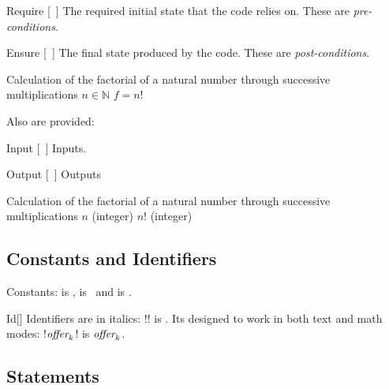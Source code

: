 \documentclass[a4paper, 11pt]{article}
\begin{document}
\begin{macro}{Require}
    [~]
    The required initial state that the code relies on. These are \textit{pre-conditions}.
\end{macro}

\begin{macro}{Ensure}
    [~]
    The final state produced by the code. These are \textit{post-conditions}.
\end{macro}

\begin{tcblisting}{}
    \begin{algorithmic}
        \Description Calculation of the factorial of a natural number through successive multiplications
        \Require $n \in \mathbb{N}$
        \Ensure $f = n!$
    \end{algorithmic}
\end{tcblisting}

Also are provided:
\begin{macro}{Input}
    [~]
    Inputs.
\end{macro}
\begin{macro}{Output}
    [~]
    Outputs
\end{macro}

\begin{tcblisting}{}
    \begin{algorithmic}
        \Description Calculation of the factorial of a natural number through successive multiplications
        \Input $n$ (integer)
        \Output $n!$ (integer)
    \end{algorithmic}
\end{tcblisting}

\subsection{Constants and Identifiers}\label{sec:constants-and-identifiers}
Constants:  is \True,  is \False\ and  is \Nil.

\begin{macro}{Id}[]
    Identifiers are in italics: \latexinline!! is . Its designed to work in both text and math modes: \latexinline!$\textit{\rmfamily offer}_k$! is $\textit{\rmfamily offer}_k$.
\end{macro}

\subsection{Statements}\label{sec:statements}
\end{document}
